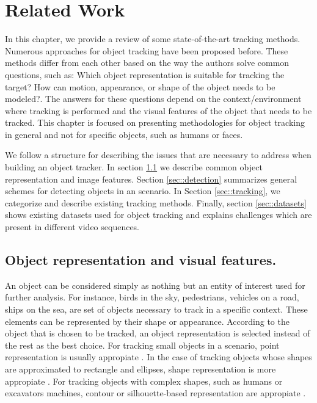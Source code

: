 \chapter{Related Work} %

\label{chapter2} %


In this chapter, we provide a review of some state-of-the-art tracking methods.
Numerous approaches for object tracking have been proposed before. These methods
differ from each other based on the way the authors solve common questions, such
as: Which object representation is suitable for tracking the target? How can
motion, appearance, or shape of the object needs to be modeled?. The answers for
these questions depend on the context/environment where tracking is performed and
the visual features of the object that needs to be tracked. This chapter is
focused on presenting methodologies for object tracking in general and not for
specific objects, such as humans or faces.

We follow a structure for describing the issues that are necessary to address
when building an object tracker. In section \ref{sec::object_representation} we
describe common object representation and image features. Section
\ref{sec::detection} summarizes general schemes for detecting objects in an
scenario. In Section \ref{sec::tracking}, we categorize and describe
existing tracking methods. Finally, section \ref{sec::datasets} shows existing
datasets used for object tracking and explains challenges which are present
in different video sequences.

\section{Object representation and visual features.}
\label{sec::object_representation}

An object can be considered simply as nothing but an entity of interest used for
further analysis. For instance, birds in the sky, pedestrians, vehicles on a
road, ships on the sea, are set of objects necessary to track in a specific
context. These elements can be represented by their shape or appearance.
According to the object that is chosen to be tracked, an object representation
is selected instead of the rest as the best choice. For tracking small objects
in a scenario, point representation is usually appropiate
\cite{Veenman2001,Shafique2005}. In the case of tracking objects whose shapes
are approximated to rectangle and ellipses, shape representation is more
appropiate \cite{Comaniciu2003a}. For tracking objects with complex shapes, such
as humans or excavators machines, contour or silhouette-based representation are
appropiate \cite{Haritaoglu2000}.


